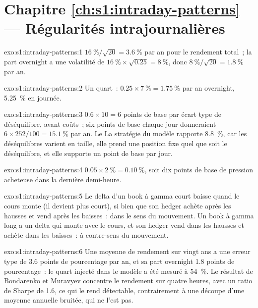  \section*{Chapitre \ref{ch:s1:intraday-patterns} --- Régularités intrajournalières}

\begin{solution}{exo:s1:intraday-patterns:1}
$16~\%/\sqrt{20} = 3.6~\%$ par an pour le rendement total~; la part overnight a une volatilité de $16~\% \times \sqrt{0.25} = 8~\%$, donc $8~\%/\sqrt{20} = 1.8~\%$ par an.
\end{solution}

\begin{solution}{exo:s1:intraday-patterns:2}
Un quart~: $0.25 \times 7~\% = 1.75~\%$ par an overnight, 5.25~\% en journée.
\end{solution}

\begin{solution}{exo:s1:intraday-patterns:3}
$0.6 \times 10 = 6$ points de base par écart type de déséquilibre, avant coûts~; six points de base chaque jour donneraient $6 \times 252/100 = 15.1~\%$ par an. Le
La stratégie du modèle rapporte 8.8~\%, car les déséquilibres varient en taille, elle prend une position fixe quel que soit le déséquilibre, et elle supporte un point de base par jour.
\end{solution}

\begin{solution}{exo:s1:intraday-patterns:4}
$0.05 \times 2~\% = 0.10~\%$, soit dix points de base de pression acheteuse dans la dernière demi-heure.
\end{solution}

\begin{solution}{exo:s1:intraday-patterns:5}
Le delta d'un book à gamma court baisse quand le cours monte (il devient plus court), si bien que son hedger achète après les hausses et vend après les baisses~: dans le sens du mouvement. Un book à gamma long
a un delta qui monte avec le cours, et son hedger vend dans les hausses et achète dans les baisses~: à contre-sens du mouvement.
\end{solution}

\begin{solution}{exo:s1:intraday-patterns:6}
Une moyenne de rendement sur vingt ans a une erreur type de 3.6 points de pourcentage par an, et sa part overnight 1.8 points de pourcentage~: le quart injecté dans le modèle a été mesuré à 54~\%.
Le résultat de Bondarenko et Muravyev concentre le rendement sur quatre heures, avec un ratio de Sharpe de 1.6, ce qui le rend détectable, contrairement à une découpe
d'une moyenne annuelle bruitée, qui ne l'est pas.
\end{solution}

